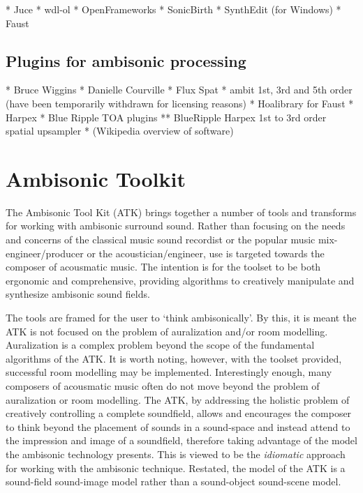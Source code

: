 \documentclass{article}
\begin{document}
* Juce
* wdl-ol
* OpenFrameworks
* SonicBirth
* SynthEdit (for Windows)
* Faust


\subsection{Plugins for ambisonic processing}\label{sec:ambi-plugins}

* Bruce Wiggins
* Danielle Courville
* Flux Spat
* ambit 1st, 3rd and 5th order (have been temporarily withdrawn for licensing reasons)
* Hoalibrary for Faust
* Harpex
* Blue Ripple TOA plugins
** BlueRipple Harpex 1st to 3rd order spatial upsampler
* (Wikipedia overview of software)




\section{Ambisonic Toolkit}\label{sec:atk}

The Ambisonic Tool Kit (ATK) brings together a number of tools and transforms for working with ambisonic surround sound.
Rather than focusing on the needs and concerns of the classical music sound recordist or the popular music mix-engineer/producer or the acoustician/engineer, use is targeted towards the composer of acousmatic music.
The intention is for the toolset to be both ergonomic and comprehensive, providing algorithms to creatively manipulate and synthesize ambisonic sound fields.

The tools are framed for the user to `think ambisonically'.
By this, it is meant the ATK is not focused on the problem of auralization and/or room modelling.
Auralization is a complex problem beyond the scope of the fundamental algorithms of the ATK.
It is worth noting, however, with the toolset provided, successful room modelling may be implemented.
Interestingly enough, many composers of acousmatic music often do not move beyond the problem of auralization or room modelling.
The ATK, by addressing the holistic problem of creatively controlling a complete soundfield, allows and encourages the composer to think beyond the placement of sounds in a sound-space and instead attend to the impression and image of a soundfield, therefore taking advantage of the model the ambisonic technology presents.
This is viewed to be the {\em idiomatic} approach for working with the ambisonic technique.
Restated, the model of the ATK is a sound-field sound-image model rather than a sound-object sound-scene model.
\end{document}
